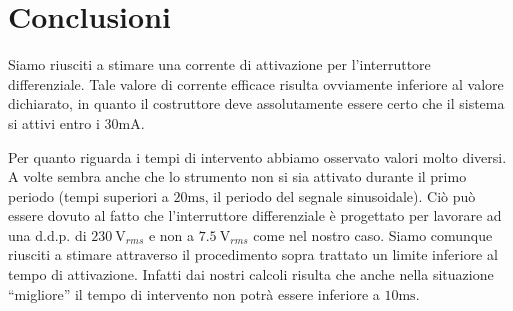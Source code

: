 \section{Conclusioni}
Siamo riusciti a stimare una corrente di attivazione per l'interruttore differenziale. Tale valore di corrente efficace risulta ovviamente inferiore al valore dichiarato, in quanto il costruttore deve assolutamente essere certo che il sistema si attivi entro i $30\si{\milli\ampere}$.

Per quanto riguarda i tempi di intervento abbiamo osservato valori molto diversi. A volte sembra anche che lo strumento non si sia attivato durante il primo periodo (tempi superiori a $20\si{\milli\second}$, il periodo del segnale sinusoidale). Ciò può essere dovuto al fatto che l'interruttore differenziale è progettato per lavorare ad una d.d.p. di $\SI{230}{\volt}_{rms}$ e non a $\SI{7.5}{\volt}_{rms}$ come nel nostro caso. Siamo comunque riusciti a stimare attraverso il procedimento sopra trattato un limite inferiore al tempo di attivazione. Infatti dai nostri calcoli risulta che anche nella situazione ``migliore'' il tempo di intervento non potrà essere inferiore a $10\si{\milli\second}$. %

